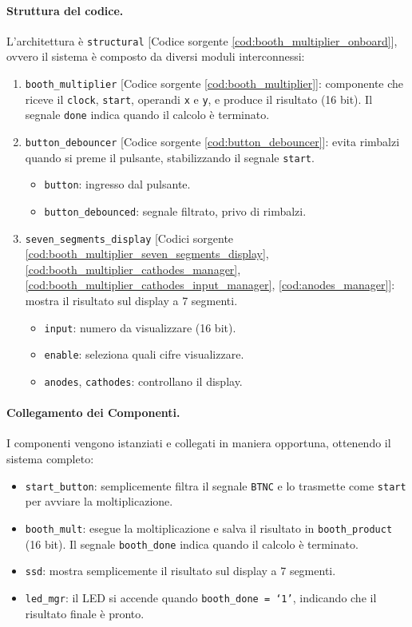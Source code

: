 \paragraph{Struttura del codice.}
L’architettura è \texttt{structural} [Codice sorgente \ref{cod:booth_multiplier_onboard}], ovvero il sistema è composto da diversi moduli interconnessi:

\begin{enumerate}
    \item \texttt{booth\_multiplier} [Codice sorgente \ref{cod:booth_multiplier}]: componente che riceve il \texttt{clock}, \texttt{start}, operandi \texttt{x} e \texttt{y}, e produce il risultato (16 bit). Il segnale \texttt{done} indica quando il calcolo è terminato.
    \item \texttt{button\_debouncer} [Codice sorgente \ref{cod:button_debouncer}]: evita rimbalzi quando si preme il pulsante, stabilizzando il segnale \texttt{start}.
    \begin{itemize}
        \item \texttt{button}: ingresso dal pulsante.
        \item \texttt{button\_debounced}: segnale filtrato, privo di rimbalzi.
    \end{itemize}
    \item \texttt{seven\_segments\_display} [Codici sorgente \ref{cod:booth_multiplier_seven_segments_display}, \ref{cod:booth_multiplier_cathodes_manager}, \ref{cod:booth_multiplier_cathodes_input_manager}, \ref{cod:anodes_manager}]: mostra il risultato sul display a 7 segmenti.
    \begin{itemize}
        \item \texttt{input}: numero da visualizzare (16 bit).
        \item \texttt{enable}: seleziona quali cifre visualizzare.
        \item \texttt{anodes}, \texttt{cathodes}: controllano il display.
    \end{itemize}
\end{enumerate}

\paragraph{Collegamento dei Componenti.} I componenti vengono istanziati e collegati in maniera opportuna, ottenendo il sistema completo:

\begin{itemize}
    \item \texttt{start\_button}: semplicemente filtra il segnale \texttt{BTNC} e lo trasmette come \texttt{start} per avviare la moltiplicazione.
    \item \texttt{booth\_mult}: esegue la moltiplicazione e salva il risultato in \texttt{booth\_product} (16 bit). Il segnale \texttt{booth\_done} indica quando il calcolo è terminato.
    \item \texttt{ssd}: mostra semplicemente il risultato sul display a 7 segmenti.
    \item \texttt{led\_mgr}: il LED si accende quando \texttt{booth\_done = `1'}, indicando che il risultato finale è pronto.
\end{itemize}

